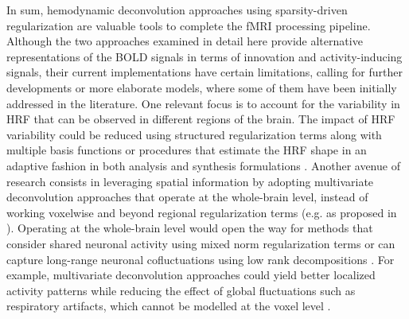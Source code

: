 In sum, hemodynamic deconvolution approaches using sparsity-driven
regularization are valuable tools to complete the fMRI processing pipeline.
Although the two approaches examined in detail here provide alternative
representations of the BOLD signals in terms of innovation and activity-inducing
signals, their current implementations have certain limitations, calling for
further developments or more elaborate models, where some of them have been
initially addressed in the literature. One relevant focus is to account for the
variability in HRF that can be observed in different regions of the brain. The
impact of HRF variability could be reduced using structured regularization terms
along with multiple basis functions
\citep{Gaudes2012Structuredsparsedeconvolution} or procedures that estimate the
HRF shape in an adaptive fashion in both analysis
\citep{Farouj2019BoldSignalDeconvolution} and synthesis formulations
\citep{cherkaoui:hal-03005584}. Another avenue of research consists in
leveraging spatial information by adopting multivariate deconvolution approaches
that operate at the whole-brain level, instead of working voxelwise and beyond
regional regularization terms (e.g. as proposed in
\citealt{Karahanoglu2013TotalactivationfMRI}).  Operating at the whole-brain
level would open the way for methods that consider shared neuronal activity
using mixed norm regularization terms \citep{urunuela-tremino_2019} or can
capture long-range neuronal cofluctuations using low rank decompositions
\citep{cherkaoui:hal-03005584}. For example, multivariate deconvolution
approaches could yield better localized activity patterns while reducing the
effect of global fluctuations such as respiratory artifacts, which cannot be
modelled at the voxel level \citealt{Urunuela_2021}. 

